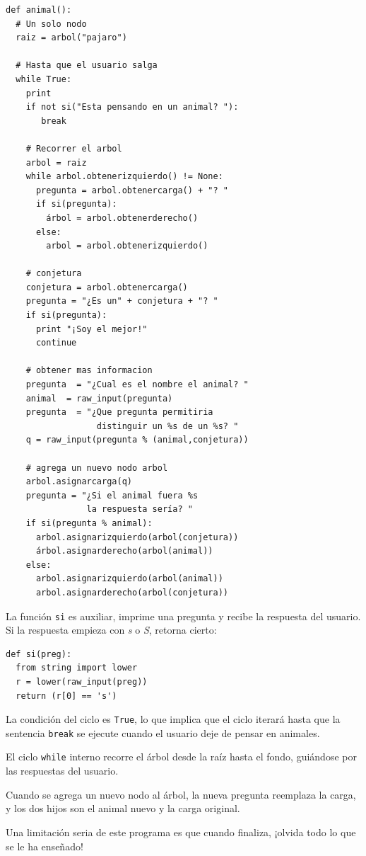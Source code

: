 
\beforeverb
\begin{verbatim}
def animal():
  # Un solo nodo
  raiz = arbol("pajaro")

  # Hasta que el usuario salga
  while True:
    print
    if not si("Esta pensando en un animal? "): 
       break

    # Recorrer el arbol
    arbol = raiz
    while arbol.obtenerizquierdo() != None:
      pregunta = arbol.obtenercarga() + "? "
      if si(pregunta):
        árbol = arbol.obtenerderecho()
      else:
        arbol = arbol.obtenerizquierdo()

    # conjetura
    conjetura = arbol.obtenercarga()
    pregunta = "¿Es un" + conjetura + "? "
    if si(pregunta):
      print "¡Soy el mejor!"
      continue

    # obtener mas informacion
    pregunta  = "¿Cual es el nombre el animal? "
    animal  = raw_input(pregunta)
    pregunta  = "¿Que pregunta permitiria 
                  distinguir un %s de un %s? "
    q = raw_input(pregunta % (animal,conjetura))

    # agrega un nuevo nodo arbol
    arbol.asignarcarga(q)
    pregunta = "¿Si el animal fuera %s 
                la respuesta sería? "
    if si(pregunta % animal):
      arbol.asignarizquierdo(arbol(conjetura))
      árbol.asignarderecho(arbol(animal))
    else:
      arbol.asignarizquierdo(arbol(animal))
      arbol.asignarderecho(arbol(conjetura))
\end{verbatim}
\afterverb
%
La función \texttt{si} es auxiliar, imprime una pregunta y recibe
la respuesta del usuario. Si la respuesta empieza con 
{\em s} o {\em S}, retorna cierto:

\beforeverb
\begin{verbatim}
def si(preg):
  from string import lower
  r = lower(raw_input(preg))
  return (r[0] == 's')
\end{verbatim}
\afterverb
%
La condición del ciclo es \texttt{True}, lo que implica que el 
ciclo iterará hasta que la sentencia \texttt{break} se 
ejecute cuando el usuario deje de pensar en animales.

El ciclo \texttt{while} interno recorre el árbol desde la raíz 
hasta el fondo, guiándose por las respuestas del usuario.

Cuando se agrega un nuevo nodo al árbol, la nueva pregunta 
reemplaza la carga, y los dos hijos son el animal nuevo y la
carga original.

Una limitación seria de este programa es que cuando finaliza, 
¡olvida todo lo que se le ha enseñado!

